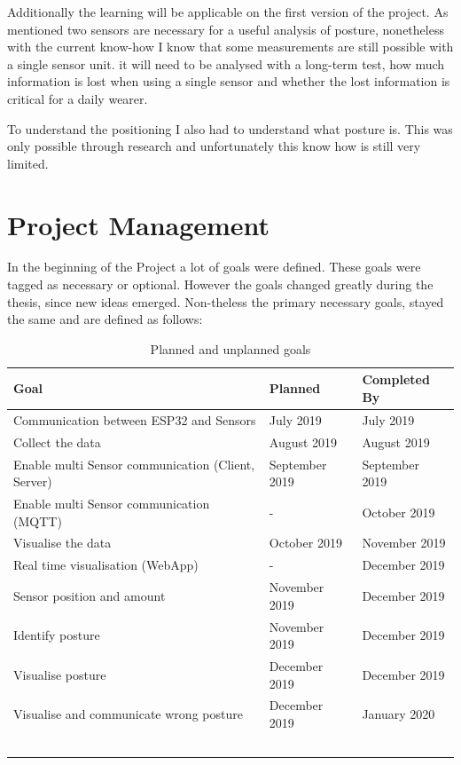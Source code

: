 Additionally the learning will be applicable on the first version of the project. As mentioned two sensors are necessary for a useful analysis of posture, nonetheless with the current know-how I know that some measurements are still possible with a single sensor unit. it will need to be analysed with a long-term test, how much information is lost when using a single sensor and whether the lost information is critical for a daily wearer.

To understand the positioning I also had to understand what posture is. This was only possible through research and unfortunately this know how is still very limited.

\section{Project Management}

In the beginning of the Project a lot of goals were defined. These goals were tagged as necessary or optional. However the goals changed greatly during the thesis, since new ideas emerged. Non-theless the primary necessary goals, stayed the same and are defined as follows: 

\begin{center}
\begin{table}[h!]
\begin{tabular}{|p{9cm}|p{3cm}|p{3cm}|}
  \hline
 \textbf{Goal} &\textbf{ Planned  } &\textbf{ Completed By } \\ 
  \hline
 Communication between ESP32 and Sensors & July 2019 & July 2019   \\  
 \hline
 Collect the data  & August 2019  & August 2019   \\  
  \hline
 Enable multi Sensor communication (Client, Server) & September 2019 & September 2019   \\ 
  \hline
 Enable multi Sensor communication (MQTT) & - & October 2019   \\ 
  \hline
 Visualise the data & October 2019 & November 2019   \\  
  \hline
 Real time visualisation (WebApp) & - & December 2019   \\  
   \hline
 Sensor position and amount & November 2019 & December 2019   \\ 
  \hline
 Identify posture & November 2019 & December 2019   \\  
  \hline
 Visualise posture & December 2019 &  December 2019 \\    
   \hline
 Visualise and communicate wrong posture & December 2019& January 2020 \\    
  \hline~
\end{tabular}
\caption{Planned and unplanned goals}
\label{table:1}
\end{table}
\end{center}

